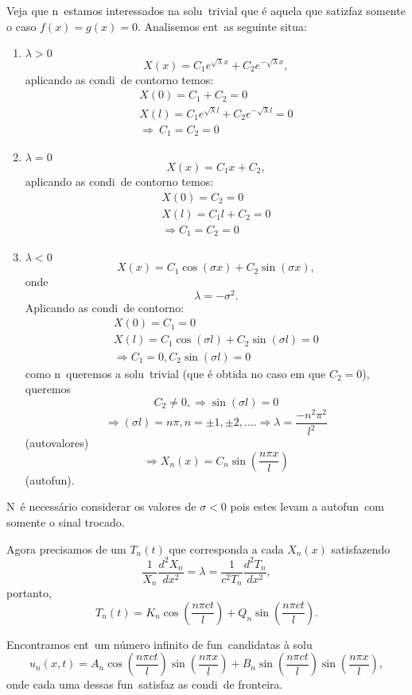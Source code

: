 Veja que n\ao\ estamos interessados na 
solu\cao\ trivial que \'e aquela que satizfaz somente o caso $f(x) = g(x) = 0$. Analisemos
ent\ao\ as seguinte situa\coes:
\begin{enumerate}
\item $\lambda > 0$ 
\[X(x) = C_{1}e^{\sqrt{\lambda}x} + C_{2}e^{-\sqrt{\lambda}x},\]
aplicando as condi\coes\ de contorno temos:
\begin{eqnarray*}
X(0) = C_{1} + C_{2} = 0 \\
X(l) = C_{1}e^{\sqrt{\lambda}l} + C_{2}e^{-\sqrt{\lambda}l} = 0 \\
\Rightarrow\ C_{1} = C_{2} = 0
\end{eqnarray*}
\item $\lambda = 0$ 
\[X(x) = C_{1}x + C_{2},\]
aplicando as condi\coes\ de contorno temos:
\begin{eqnarray*}
X(0) = C_{2} = 0 \\
X(l) = C_{1}l + C_{2} = 0 \\
\Rightarrow C_{1} = C_{2} = 0
\end{eqnarray*}
\item $\lambda < 0$ 
\[X(x) = C_{1}\cos (\sigma x) + C_{2}\sin (\sigma x),\] onde 
\[\lambda = -\sigma^{2}.\]
Aplicando as condi\coes\ de contorno: \\
\begin{eqnarray*}
X(0) = C_{1} = 0 \\ 
X(l) = C_{1}\cos (\sigma l) + C_{2}\sin (\sigma l) = 0 \\
\Rightarrow C_{1} = 0, C_{2}\sin (\sigma l) = 0
\end{eqnarray*}
como n\ao\ queremos a solu\cao\ trivial (que \'e obtida no caso em que $C_{2} = 0$), queremos 
\[C_{2} \neq 0, \Rightarrow \sin (\sigma l) = 0 \]
\[\Rightarrow (\sigma l) = n\pi, n = \pm1, \pm2, .... \Rightarrow \lambda =
\frac{-n^{2}\pi^{2}}{l^{2}}\] (autovalores) 
\[\Rightarrow X_{n}(x) = C_{n}\sin (\frac{n\pi x}{l})\] (autofun\coes).
\end{enumerate}
N\ao\ \'e necess\'ario considerar os valores de $\sigma < 0$ pois
estes levam a autofun\coes\ com somente o sinal trocado.

Agora precisamos de um $T_{n}(t)$ que corresponda a cada
$X_{n}(x)$ satisfazendo
\[\frac{1}{X_{n}}\frac{d^{2}X_{n}}{dx^{2}} = \lambda = \frac{1}{c^{2}T_{n}}\frac{d^{2}T_{n}}{dx^{2}},\]
portanto,
\[T_{n}(t) = K_{n}\cos (\frac{n\pi ct}{l}) + Q_{n}\sin (\frac{n\pi ct}{l}).\]

Encontramos ent\ao\ um n\'umero infinito de fun\coes\ candidatas \`a
solu\cao\ 
\[u_{n}(x,t) = A_{n}\cos (\frac{n\pi ct}{l})\sin (\frac{n\pi x}{l}) +
B_{n}\sin (\frac{n\pi ct}{l})\sin (\frac{n\pi x}{l}),\]
onde cada uma dessas fun\coes\ satisfaz as condi\coes\ de
fronteira. 

